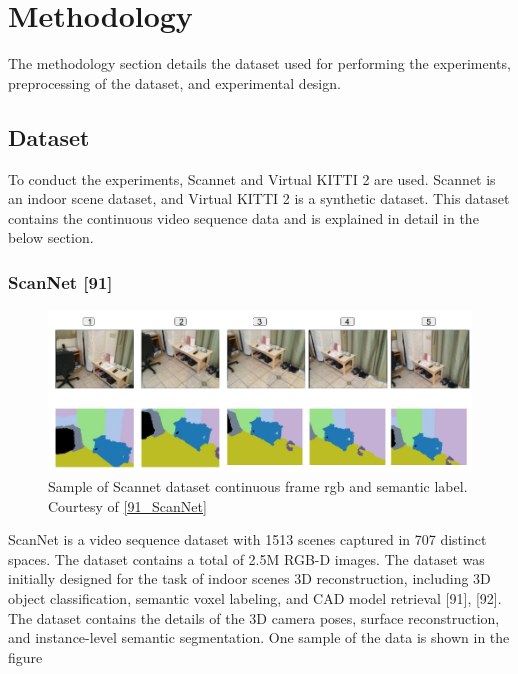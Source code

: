 

    \chapter{Methodology}
	\label{chap:methodology}
	
	The methodology section details the dataset used for performing the experiments, preprocessing of the dataset, and experimental design.

    \section{Dataset}
    
	To conduct the experiments, Scannet and Virtual KITTI 2 are used. Scannet is an indoor scene dataset, and Virtual KITTI 2 is a synthetic dataset. This dataset contains the continuous video sequence data and is explained in detail in the below section.
    
    \subsection{ScanNet [91]}

	\begin{figure}
		\centering
		\includegraphics[width=17cm]{images/images_segm_scannet.png}
		\caption{Sample of Scannet dataset continuous frame rgb and semantic label. Courtesy of \ref{91_ScanNet} }
		\label{fig:sample_rgb_seg_scannet}
	\end{figure}
        
	ScanNet is a video sequence dataset with 1513 scenes captured in 707 distinct spaces. The dataset contains a total of 2.5M RGB-D images. The dataset was initially designed for the task of indoor scenes 3D reconstruction, including 3D object classification, semantic voxel labeling, and CAD model retrieval [91], [92]. The dataset contains the details of the 3D camera poses, surface reconstruction, and instance-level semantic segmentation. One sample of the data is shown in the figure
	

